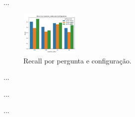                 ...
                
                \begin{figure}[h!]
                    \centering              
                    \includegraphics[width=0.25\textwidth]{images_part_2/question_recall_question_index_configuration.png}
                    \caption{Recall por pergunta e configuração.}
                    \label{fig:question_recall_question_index_configuration}
                \end{figure}

                ...

                ...

                ...
            